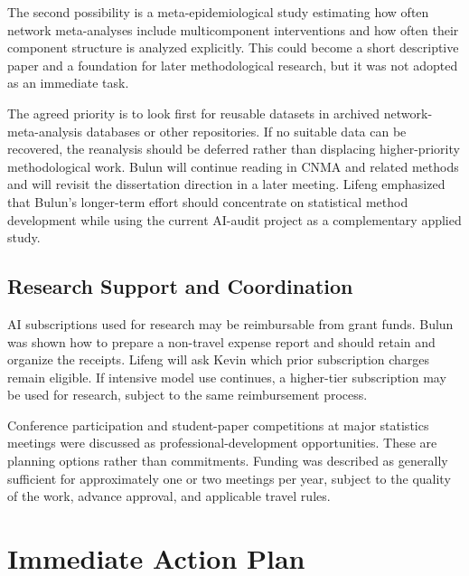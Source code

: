 \documentclass[11pt]{article}
\begin{document}
The second possibility is a meta-epidemiological study estimating how often network meta-analyses include multicomponent interventions and how often their component structure is analyzed explicitly. This could become a short descriptive paper and a foundation for later methodological research, but it was not adopted as an immediate task.

The agreed priority is to look first for reusable datasets in archived network-meta-analysis databases or other repositories. If no suitable data can be recovered, the reanalysis should be deferred rather than displacing higher-priority methodological work. Bulun will continue reading in CNMA and related methods and will revisit the dissertation direction in a later meeting. Lifeng emphasized that Bulun's longer-term effort should concentrate on statistical method development while using the current AI-audit project as a complementary applied study.

\subsection*{Research Support and Coordination}

AI subscriptions used for research may be reimbursable from grant funds. Bulun was shown how to prepare a non-travel expense report and should retain and organize the receipts. Lifeng will ask Kevin which prior subscription charges remain eligible. If intensive model use continues, a higher-tier subscription may be used for research, subject to the same reimbursement process.

Conference participation and student-paper competitions at major statistics meetings were discussed as professional-development opportunities. These are planning options rather than commitments. Funding was described as generally sufficient for approximately one or two meetings per year, subject to the quality of the work, advance approval, and applicable travel rules.

\section*{Immediate Action Plan}
\end{document}
